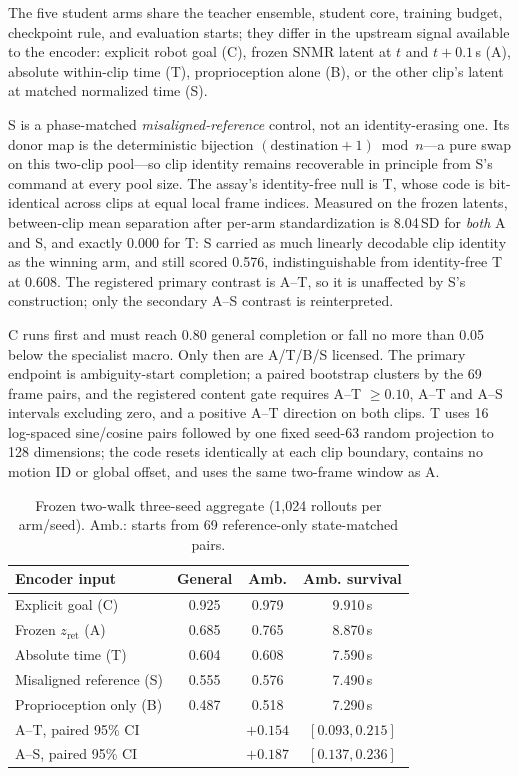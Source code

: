 \documentclass[conference]{IEEEtran}
\newcommand{\EEndpointShort}{three-seed aggregate}%
\newcommand{\EExplicitGeneral}{0.925}
\newcommand{\EExplicitAmb}{0.979}
\newcommand{\EExplicitSurvival}{9.910}
\newcommand{\ESnmrGeneral}{0.685}
\newcommand{\ESnmrAmb}{0.765}
\newcommand{\ESnmrSurvival}{8.870}
\newcommand{\ETimeGeneral}{0.604}
\newcommand{\ETimeAmb}{0.608}
\newcommand{\ETimeSurvival}{7.590}
\newcommand{\EProprioGeneral}{0.487}
\newcommand{\EProprioAmb}{0.518}
\newcommand{\EProprioSurvival}{7.290}
\newcommand{\EShuffledGeneral}{0.555}
\newcommand{\EShuffledAmb}{0.576}
\newcommand{\EShuffledSurvival}{7.490}
\newcommand{\EATDifference}{+0.154}
\newcommand{\EATCILow}{0.093}
\newcommand{\EATCIHigh}{0.215}
\newcommand{\EASDifference}{+0.187}
\newcommand{\EASCILow}{0.137}
\newcommand{\EASCIHigh}{0.236}
\newcommand{\EEndpointShort}{seed-0 endpoint}%
\begin{document}
The five student arms share the teacher ensemble, student core, training budget,
checkpoint rule, and evaluation starts; they differ in the upstream signal available to
the encoder: explicit robot goal (C), frozen SNMR latent at $t$ and $t{+}0.1$\,s (A),
absolute within-clip time (T), proprioception alone (B), or the other clip's latent at
matched normalized time (S).

S is a phase-matched \emph{misaligned-reference} control, not an identity-erasing one.  Its
donor map is the deterministic bijection $(\mathrm{destination}+1)\bmod n$---a pure swap on
this two-clip pool---so clip identity remains recoverable in principle from S's command at
every pool size.  The assay's identity-free null is T, whose code is bit-identical across
clips at equal local frame indices.  Measured on the frozen latents, between-clip mean
separation after per-arm standardization is 8.04\,SD for \emph{both} A and S, and exactly
0.000 for T: S carried as much linearly decodable clip identity as the winning arm, and
still scored \EShuffledAmb{}, indistinguishable from identity-free T at \ETimeAmb{}.  The
registered primary contrast is A--T, so it is unaffected by S's construction; only the
secondary A--S contrast is reinterpreted.

C runs first and
must reach 0.80 general completion or fall no more than 0.05 below the specialist
macro.  Only then are A/T/B/S licensed.  The primary endpoint is ambiguity-start
completion; a paired bootstrap clusters by the 69 frame pairs, and the registered
content gate requires A--T $\geq0.10$, A--T and A--S intervals excluding zero, and a
positive A--T direction on both clips.  T uses 16 log-spaced sine/cosine pairs followed
by one fixed seed-63 random projection to 128 dimensions; the code resets identically at
each clip boundary, contains no motion ID or global offset, and uses the same two-frame
window as A.

\begin{table}[t]
\centering
\caption{Frozen two-walk \EEndpointShort{} (1,024 rollouts per arm/seed). Amb.: starts from
69 reference-only state-matched pairs.}
\label{tab:main}
\setlength{\tabcolsep}{3.4pt}
\begin{tabular}{lccc}
\toprule
Encoder input & General & Amb. & Amb. survival \\
\midrule
Explicit goal (C) & \EExplicitGeneral & \EExplicitAmb & \EExplicitSurvival\,s \\
Frozen $z_{\mathrm{ret}}$ (A) & \ESnmrGeneral & \ESnmrAmb & \ESnmrSurvival\,s \\
Absolute time (T) & \ETimeGeneral & \ETimeAmb & \ETimeSurvival\,s \\
Misaligned reference (S) & \EShuffledGeneral & \EShuffledAmb & \EShuffledSurvival\,s \\
Proprioception only (B) & \EProprioGeneral & \EProprioAmb & \EProprioSurvival\,s \\
\midrule
A--T, paired 95\% CI & & $\EATDifference$ & $[\EATCILow,\EATCIHigh]$ \\
A--S, paired 95\% CI & & $\EASDifference$ & $[\EASCILow,\EASCIHigh]$ \\
\bottomrule
\end{tabular}
\end{table}
\end{document}
